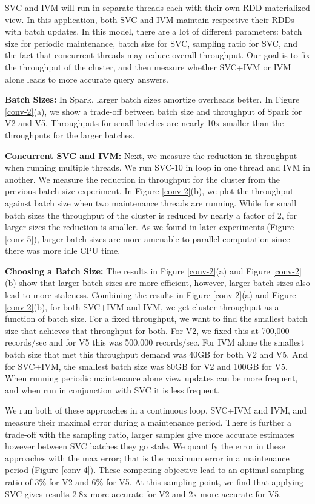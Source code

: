SVC and IVM will run in separate threads each with their own RDD materialized view.
In this application, both SVC and IVM maintain respective their RDDs with batch updates.
In this model, there are a lot of different parameters: batch size for periodic maintenance, batch size for SVC, sampling ratio for SVC, and the fact that concurrent threads may reduce overall throughput.
Our goal is to fix the throughput of the cluster, and then measure whether SVC+IVM or IVM alone leads to more accurate query answers.

\textbf{Batch Sizes:} In Spark, larger batch sizes amortize overheads better.
In Figure \ref{conv-2}(a), we show a trade-off between batch size and throughput of Spark for V2 and V5.
Throughputs for small batches are nearly 10x smaller than the throughputs for the larger batches. 

\textbf{Concurrent SVC and IVM:} Next, we measure the reduction in throughput when running multiple threads.
We run SVC-10 in loop in one thread and IVM in another.
We measure the reduction in throughput for the cluster from the previous batch size experiment.
In Figure \ref{conv-2}(b), we plot the throughput against batch size when two maintenance threads are running.
While for small batch sizes the throughput of the cluster is reduced by nearly a factor of 2, for larger sizes the reduction is
smaller.
As we found in later experiments (Figure \ref{conv-5}), larger batch sizes are more amenable to parallel computation since there was more idle CPU time.

\textbf{Choosing a Batch Size:}
The results in Figure \ref{conv-2}(a) and Figure \ref{conv-2}(b) show that larger batch sizes are more efficient, however, larger batch sizes also lead to more staleness.
Combining the results in Figure \ref{conv-2}(a) and Figure \ref{conv-2}(b), for both SVC+IVM and IVM, we get cluster throughput as a function of batch size.
For a fixed throughput, we want to find the smallest batch size that achieves that throughput for both.
For V2, we fixed this at 700,000 records/sec and for V5 this was 500,000 records/sec.
For IVM alone the smallest batch size that met this throughput demand was 40GB for both V2 and V5.
And for SVC+IVM, the smallest batch size was 80GB for V2 and 100GB for V5. 
When running periodic maintenance alone view updates can be more frequent, and when run in conjunction with SVC it is less frequent. 

We run both of these approaches in a continuous loop, SVC+IVM and IVM, and measure their maximal error during a maintenance period.
There is further a trade-off with the sampling ratio, larger samples give more accurate estimates however between SVC batches they go stale.
We quantify the error in these approaches with the max error; that is the maximum error in a maintenance period (Figure \ref{conv-4}).
These competing objective lead to an optimal sampling ratio of 3\% for V2 and 6\% for V5.
At this sampling point, we find that applying SVC gives results 2.8x more accurate for V2 and 2x more accurate for V5.

